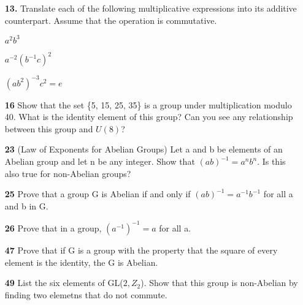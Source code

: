 \documentclass[12pt, crop, tikz]{report}
\begin{document}
\begin{enumerate}
     \item[{\bf 13.}] Translate each of the following multiplicative expressions into its additive counterpart. Assume that the operation is commutative.
     
      $a^2b^3$

      $a^{-2}(b^{-1}c)^2$

      $(ab^2)^{-3}c^2 = e$
     
    \item[{\bf 16}] Show that the set \{5, 15, 25, 35\} is a group under multiplication modulo 40. What is the identity element of this group? Can you see any relationship between this group and $U(8)$?
    
    \item[{\bf 23}] (Law of Exponents for Abelian Groups) Let a and b be elements of an Abelian group and let n be any integer. Show that $(ab)^{-1} = a^nb^n$. Is this also true for non-Abelian groups?
    
    \item[{\bf 25}] Prove that a group G is Abelian if and only if $(ab)^{-1} = a^{-1}b^{-1}$ for all a and b in G.
    
    \item[{\bf 26}] Prove that in a group, $(a^{-1})^{-1} = a$ for all a.
    
    \item[{\bf 47}] Prove that if G is a group with the property that the square of every element is the identity, the G is Abelian.
    
    \item[{\bf 49}] List the six elements of GL($2, Z_2$). Show that this group is non-Abelian by finding two elemetns that do not commute.
     
\end{enumerate}
\end{document}
